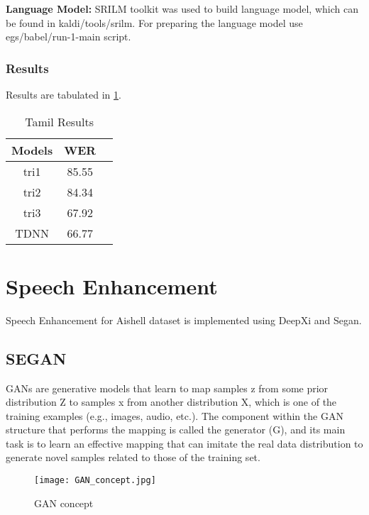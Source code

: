 \documentclass[12pt]{article}
\begin{document}
\textbf{Language Model:} SRILM toolkit was used to build language model, which can be found in kaldi/tools/srilm. For preparing the language model use egs/babel/run-1-main script.

\subsubsection{Results}
Results are tabulated in \ref{tab:Tamil}.
\begin{table} [h!]
	\centering
		\caption{ Tamil Results }
\label{tab:Tamil}
\begin{tabular}{ | c || c | c | }
\hline Models & WER\\ 
\hline
\hline tri1 & 85.55\\
\hline tri2 & 84.34\\
\hline tri3 & 67.92\\
\hline TDNN & 66.77\\
\hline

\end{tabular}
\end{table}

\section{Speech Enhancement }
Speech Enhancement for Aishell dataset is implemented using DeepXi and Segan.

\subsection{SEGAN}
GANs are generative models that learn to map samples z from some prior distribution Z to samples x from another distribution X, which is one of the training examples (e.g., images, audio, etc.). The component within the GAN structure that performs the mapping is called the generator (G), and its main task is to learn an effective mapping that can imitate the real data distribution to generate novel samples related to those of the training set.

\begin{figure}[H]
\centering
\texttt{[image: GAN\_concept.jpg]}
\caption{GAN concept}
\label{fig:GAN concept}
\end{figure}
\end{document}
